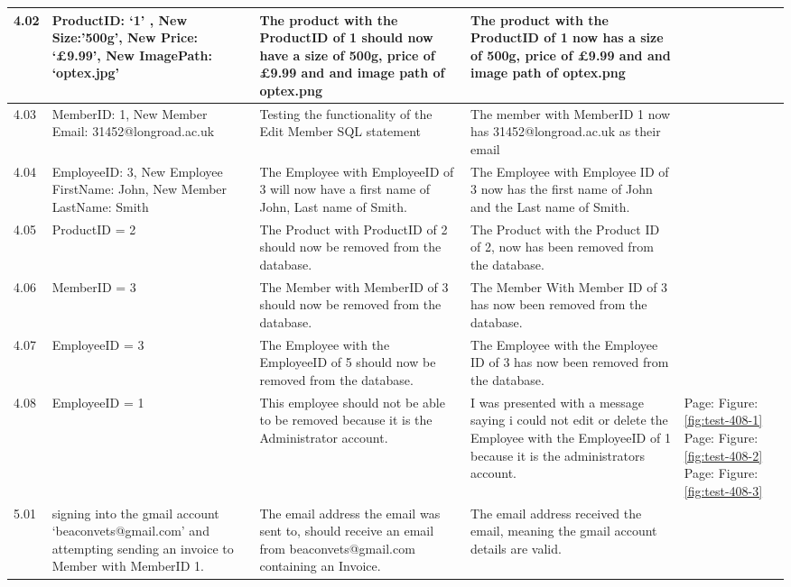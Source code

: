 \begin{flushleft}
\begin{longtable}{|p{1.0cm}|p{2.5cm}|p{3cm}|p{3.0cm}|p{2.5cm}|}
	4.02 & ProductID: `1' ,  New Size:'500g', New Price: `£9.99',  New ImagePath: `optex.jpg' & The product with the ProductID of 1 should now have a size of 500g, price of £9.99 and and image path of optex.png& The product with the ProductID of 1 now has a size of 500g, price of £9.99 and and image path of optex.png&  \\ \hline
	4.03 & MemberID: 1, New Member Email: 31452@longroad.ac.uk & Testing the functionality of the Edit Member SQL statement & The member with MemberID 1 now has 31452@longroad.ac.uk as their email & \\ \hline
	4.04 & EmployeeID: 3, New Employee FirstName: John, New Member LastName: Smith  & The Employee with EmployeeID of 3 will now have a first name of John, Last name of Smith.& The Employee with Employee ID of 3 now has the first name of John and the Last name of Smith. &  \\ \hline 
	4.05 & ProductID = 2 & The Product with ProductID of 2 should now be removed from the database.& The Product with the Product ID of 2, now has been removed from the database.& \\ \hline
	4.06 & MemberID = 3 & The Member with MemberID of 3 should now be removed from the database.& The Member With Member ID of 3 has now been removed from the database.& \\ \hline
	4.07 & EmployeeID = 3 & The Employee with the EmployeeID of 5 should now be removed from the database. & The Employee with the Employee ID of 3 has now been removed from the database.&  \\ \hline
	4.08 &  EmployeeID = 1 & This employee should not be able to be removed because it is the Administrator account.& I was presented with a message saying i could not edit or delete the Employee with the EmployeeID of 1 because it is the administrators account. & Page:\pageref{fig:test-408-1}  \newline Figure:\ref{fig:test-408-1} \newline \newline Page:\pageref{fig:test-408-2}  \newline Figure:\ref{fig:test-408-2} \newline \newline Page:\pageref{fig:test-408-3}  \newline Figure:\ref{fig:test-408-3}\\ \hline
	5.01 &  signing into the gmail account `beaconvets@gmail.com' and attempting sending an invoice to Member with MemberID 1.  & The email address the email was sent to, should receive an email from beaconvets@gmail.com containing an Invoice. & The email address received the email, meaning the gmail account details are valid. & \\ \hline

\end{longtable}
\end{flushleft}
